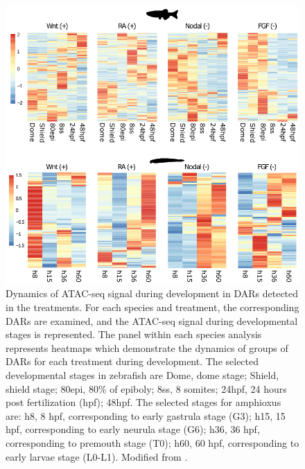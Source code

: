 \begin{figure}[hp]
\centering
\includegraphics[width=1\textwidth]{Figures/Dynamic_behaviour}
\caption[DARs developmental dynamics]{ Dynamics of ATAC-seq signal during development in DARs detected in the treatments. For each species and treatment, the corresponding DARs are examined, and the ATAC-seq signal during developmental stages is represented. The panel within each species analysis represents heatmaps which demonstrate the dynamics of groups of DARs for each treatment during development. The selected developmental stages in zebrafish are Dome, dome stage; Shield, shield stage; 80epi, 80\% of epiboly; 8ss, 8 somites; 24hpf, 24 hours post fertilization (hpf); 48hpf. The selected stages for amphioxus are: h8, 8 hpf, corresponding to early gastrula stage (G3); h15, 15 hpf, corresponding to early neurula stage (G6); h36, 36 hpf, corresponding to premouth stage (T0); h60, 60 hpf, corresponding to early larvae stage (L0-L1). Modified from \parencite{gil-galvez_gain_2022}.
}
\label{fig:Dynamic_behaviour}
\end{figure} 

